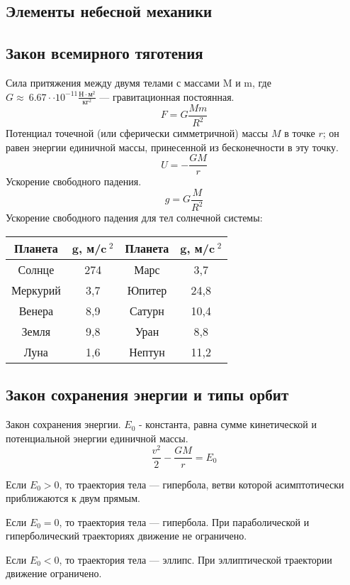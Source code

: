 \documentclass[10pt,a5paper]{article}
\begin{document}
\begin{center}
\section*{Элементы небесной механики}
\end{center}
\subsection*{Закон всемирного тяготения}

Сила притяжения между двумя телами с массами M и m, где $G\approx\ 6.67\cdot \cdot10^{-11}\frac{\text{Н}\cdot \text{м}^2}{\text{кг}^2}$ --- гравитационная постоянная.$$F=G\frac{Mm}{R^2}$$
Потенциал точечной (или сферически симметричной) массы $M$ в точке $r$; он равен энергии единичной массы, принесенной из бесконечности в эту точку.$$U=-\frac{GM}{r}$$
Ускорение свободного падения.$$g=G\frac{M}{R^2}$$
Ускорение свободного падения для тел солнечной системы:
\begin{table}[h!]
\centering
\begin{tabular}{|c|c|c|c|}
\hline 
\textbf{Планета} & $\mathbf{g}$, \textbf{м/c$~^2$} & \textbf{Планета} & $\mathbf{g}$, \textbf{м/c$~^2$}\\
\hline
Солнце & 274 & Марс & 3,7\\
\hline
Меркурий & 3,7 & Юпитер & 24,8\\
\hline
Венера & 8,9 & Сатурн & 10,4\\
\hline
Земля & 9,8 & Уран & 8,8\\
\hline
Луна & 1,6 & Нептун & 11,2\\
\hline
\end{tabular}
\end{table}
\subsection*{Закон сохранения энергии и типы орбит}

Закон сохранения энергии. $E_0$ - константа, равна сумме кинетической и потенциальной энергии единичной массы.$$\frac{v^2}{2}-\frac{GM}{r}=E_0$$

Если $E_0>0$, то траектория тела --- гипербола, ветви которой асимптотически приближаются к двум прямым.

Если $E_0=0$, то траектория тела --- гипербола. При параболической и гиперболический траекториях движение не ограничено.

Если $E_0<0$, то траектория тела --- эллипс. При эллиптической траектории движение ограничено.
\end{document}
